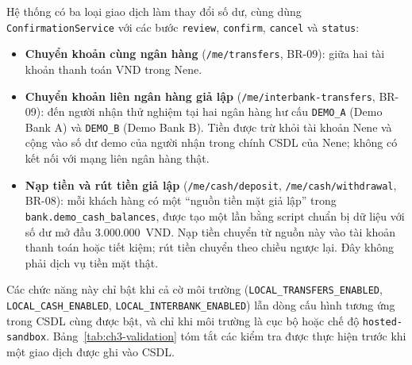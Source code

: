 Hệ thống có ba loại giao dịch làm thay đổi số dư, cùng dùng \texttt{Confirmation\allowbreak{}Service} với các bước \texttt{review}, \texttt{confirm}, \texttt{cancel} và \texttt{status}:
\begin{itemize}
	\item \textbf{Chuyển khoản cùng ngân hàng} (\texttt{/\allowbreak{}me/\allowbreak{}transfers}, BR-09): giữa hai tài khoản thanh toán VND trong Nene.
	\item \textbf{Chuyển khoản liên ngân hàng giả lập} (\texttt{/\allowbreak{}me/\allowbreak{}interbank-\allowbreak{}transfers}, BR-09): đến người nhận thử nghiệm tại hai ngân hàng hư cấu \texttt{DEMO\_\allowbreak{}A} (Demo Bank A) và \texttt{DEMO\_\allowbreak{}B} (Demo Bank B). Tiền được trừ khỏi tài khoản Nene và cộng vào số dư demo của người nhận trong chính CSDL của Nene; không có kết nối với mạng liên ngân hàng thật.
	\item \textbf{Nạp tiền và rút tiền giả lập} (\texttt{/\allowbreak{}me/\allowbreak{}cash/\allowbreak{}deposit}, \texttt{/\allowbreak{}me/\allowbreak{}cash/\allowbreak{}withdrawal}, BR-08): mỗi khách hàng có một ``nguồn tiền mặt giả lập'' trong \texttt{bank.\allowbreak{}demo\_\allowbreak{}cash\_\allowbreak{}balances}, được tạo một lần bằng script chuẩn bị dữ liệu với số dư mở đầu 3.000.000~VND. Nạp tiền chuyển từ nguồn này vào tài khoản thanh toán hoặc tiết kiệm; rút tiền chuyển theo chiều ngược lại. Đây không phải dịch vụ tiền mặt thật.
\end{itemize}

Các chức năng này chỉ bật khi cả cờ môi trường (\texttt{LOCAL\_\allowbreak{}TRANSFERS\_\allowbreak{}ENABLED}, \texttt{LOCAL\_\allowbreak{}CASH\_\allowbreak{}ENABLED}, \texttt{LOCAL\_\allowbreak{}INTERBANK\_\allowbreak{}ENABLED}) lẫn dòng cấu hình tương ứng trong CSDL cùng được bật, và chỉ khi môi trường là cục bộ hoặc chế độ \texttt{hosted-\allowbreak{}sandbox}. Bảng~\ref{tab:ch3-validation} tóm tắt các kiểm tra được thực hiện trước khi một giao dịch được ghi vào CSDL.

